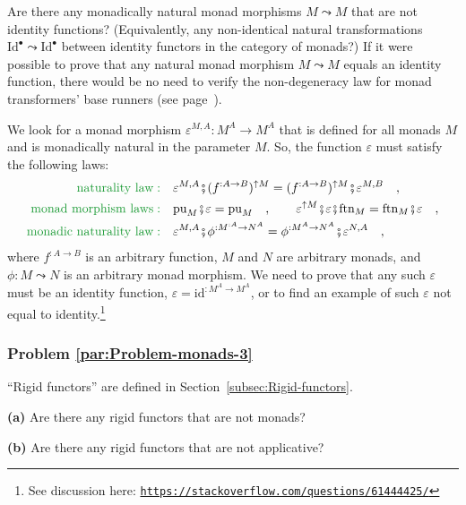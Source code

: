 Are there any monadically natural monad morphisms $M\leadsto M$ that
are not identity functions? (Equivalently, any non-identical natural
transformations $\text{Id}^{\bullet}\leadsto\text{Id}^{\bullet}$
between identity functors in the category of monads?) If it were possible
to prove that any natural monad morphism $M\leadsto M$ equals an
identity function, there would be no need to verify the non-degeneracy
law for monad transformers\textsf{'} base runners (see page~\pageref{par:Open-question-monad-id-trans}).

We look for a monad morphism $\varepsilon^{M,A}:M^{A}\rightarrow M^{A}$
that is defined for all monads $M$ and is monadically natural in
the parameter $M$. So, the function $\varepsilon$ must satisfy the
following laws:
\begin{align*}
{\color{greenunder}\text{naturality law}:}\quad & \varepsilon^{M,A}\bef(f^{:A\rightarrow B})^{\uparrow M}=(f^{:A\rightarrow B})^{\uparrow M}\bef\varepsilon^{M,B}\quad,\\
{\color{greenunder}\text{monad morphism laws}:}\quad & \text{pu}_{M}\bef\varepsilon=\text{pu}_{M}\quad,\quad\quad\varepsilon^{\uparrow M}\bef\varepsilon\bef\text{ftn}_{M}=\text{ftn}_{M}\bef\varepsilon\quad,\\
{\color{greenunder}\text{monadic naturality law}:}\quad & \varepsilon^{M,A}\bef\phi^{:M^{:A}\rightarrow N^{A}}=\phi^{:M^{A}\rightarrow N^{A}}\bef\varepsilon^{N,A}\quad,
\end{align*}
where $f^{:A\rightarrow B}$ is an arbitrary function, $M$ and $N$
are arbitrary monads, and $\phi:M\leadsto N$ is an arbitrary monad
morphism. We need to prove that any such $\varepsilon$ must be an
identity function, $\varepsilon=\text{id}^{:M^{A}\rightarrow M^{A}}$,
or to find an example of such $\varepsilon$ not equal to identity.\footnote{See discussion here: \texttt{\href{https://stackoverflow.com/questions/61444425/}{https://stackoverflow.com/questions/61444425/}}}

\subsubsection{Problem \label{par:Problem-monads-3}\ref{par:Problem-monads-3}}

\textsf{``}Rigid functors\textsf{''} are defined
in Section~\ref{subsec:Rigid-functors}.

\textbf{(a)} Are there any rigid functors that are not monads? 

\textbf{(b)} Are there any rigid functors that are not applicative?

